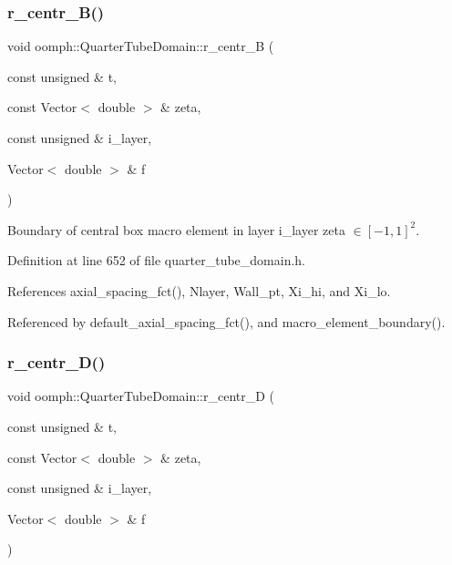 \mbox{\label{classoomph_1_1QuarterTubeDomain_a32896043befe8df1ff01d9de166c1201}} 
\subsubsection{\texorpdfstring{r\+\_\+centr\+\_\+\+B()}{r\_centr\_B()}}
{\footnotesize\ttfamily void oomph\+::\+Quarter\+Tube\+Domain\+::r\+\_\+centr\+\_\+B (\begin{DoxyParamCaption}\item[{const unsigned \&}]{t,  }\item[{const Vector$<$ double $>$ \&}]{zeta,  }\item[{const unsigned \&}]{i\+\_\+layer,  }\item[{Vector$<$ double $>$ \&}]{f }\end{DoxyParamCaption})\hspace{0.3cm}{\ttfamily [private]}}



Boundary of central box macro element in layer i\+\_\+layer zeta $ \in [-1,1]^2 $. 



Definition at line 652 of file quarter\+\_\+tube\+\_\+domain.\+h.



References axial\+\_\+spacing\+\_\+fct(), Nlayer, Wall\+\_\+pt, Xi\+\_\+hi, and Xi\+\_\+lo.



Referenced by default\+\_\+axial\+\_\+spacing\+\_\+fct(), and macro\+\_\+element\+\_\+boundary().

\mbox{\label{classoomph_1_1QuarterTubeDomain_a4012aa5d6f8c535150823478164639c3}} 
\subsubsection{\texorpdfstring{r\+\_\+centr\+\_\+\+D()}{r\_centr\_D()}}
{\footnotesize\ttfamily void oomph\+::\+Quarter\+Tube\+Domain\+::r\+\_\+centr\+\_\+D (\begin{DoxyParamCaption}\item[{const unsigned \&}]{t,  }\item[{const Vector$<$ double $>$ \&}]{zeta,  }\item[{const unsigned \&}]{i\+\_\+layer,  }\item[{Vector$<$ double $>$ \&}]{f }\end{DoxyParamCaption})\hspace{0.3cm}{\ttfamily [private]}}




